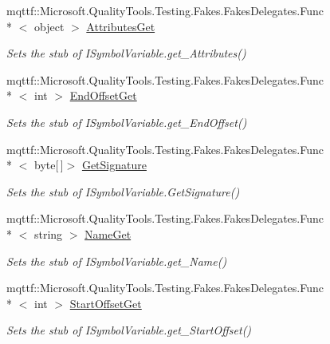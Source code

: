 \begin{DoxyCompactItemize}
mqttf\-::\-Microsoft.\-Quality\-Tools.\-Testing.\-Fakes.\-Fakes\-Delegates.\-Func\\*
$<$ object $>$ \hyperlink{class_system_1_1_diagnostics_1_1_symbol_store_1_1_fakes_1_1_stub_i_symbol_variable_a972ca8769d355609be455fe6c7e36244}{Attributes\-Get}
\begin{DoxyCompactList}\small\item\em Sets the stub of I\-Symbol\-Variable.\-get\-\_\-\-Attributes()\end{DoxyCompactList}\item 
mqttf\-::\-Microsoft.\-Quality\-Tools.\-Testing.\-Fakes.\-Fakes\-Delegates.\-Func\\*
$<$ int $>$ \hyperlink{class_system_1_1_diagnostics_1_1_symbol_store_1_1_fakes_1_1_stub_i_symbol_variable_ab0721803b37df6e176a81b22db53d0ec}{End\-Offset\-Get}
\begin{DoxyCompactList}\small\item\em Sets the stub of I\-Symbol\-Variable.\-get\-\_\-\-End\-Offset()\end{DoxyCompactList}\item 
mqttf\-::\-Microsoft.\-Quality\-Tools.\-Testing.\-Fakes.\-Fakes\-Delegates.\-Func\\*
$<$ byte\mbox{[}$\,$\mbox{]}$>$ \hyperlink{class_system_1_1_diagnostics_1_1_symbol_store_1_1_fakes_1_1_stub_i_symbol_variable_a8f7ad29eba6fde3a481ca54d01c0f4d3}{Get\-Signature}
\begin{DoxyCompactList}\small\item\em Sets the stub of I\-Symbol\-Variable.\-Get\-Signature()\end{DoxyCompactList}\item 
mqttf\-::\-Microsoft.\-Quality\-Tools.\-Testing.\-Fakes.\-Fakes\-Delegates.\-Func\\*
$<$ string $>$ \hyperlink{class_system_1_1_diagnostics_1_1_symbol_store_1_1_fakes_1_1_stub_i_symbol_variable_a2d42dad9a48b4a6d3a8ac680ae2ce06d}{Name\-Get}
\begin{DoxyCompactList}\small\item\em Sets the stub of I\-Symbol\-Variable.\-get\-\_\-\-Name()\end{DoxyCompactList}\item 
mqttf\-::\-Microsoft.\-Quality\-Tools.\-Testing.\-Fakes.\-Fakes\-Delegates.\-Func\\*
$<$ int $>$ \hyperlink{class_system_1_1_diagnostics_1_1_symbol_store_1_1_fakes_1_1_stub_i_symbol_variable_ae35671fd6c7c5c80608ae4e62fefd652}{Start\-Offset\-Get}
\begin{DoxyCompactList}\small\item\em Sets the stub of I\-Symbol\-Variable.\-get\-\_\-\-Start\-Offset()\end{DoxyCompactList}\end{DoxyCompactItemize}


